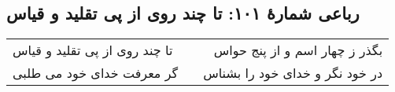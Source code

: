 \begin{center}
\section*{رباعی شمارهٔ ۱۰۱: تا چند روی از پی تقلید و قیاس}
\label{sec:101}
\begin{longtable}{l p{0.5cm} r}
تا چند روی از پی تقلید و قیاس
&&
بگذر ز چهار اسم و از پنج حواس
\\
گر معرفت خدای خود می طلبی
&&
در خود نگر و خدای خود را بشناس
\\
\end{longtable}
\end{center}
